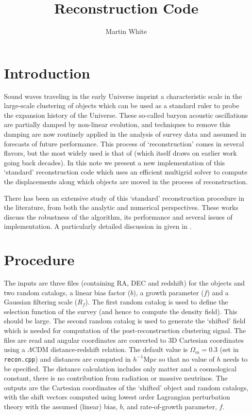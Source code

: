 \documentclass[a4paper,11pt]{article}
\author[a,b]{Martin White}
\affiliation[a]{Department of Physics, University of California,
Berkeley, CA}
\affiliation[b]{Lawrence Berkeley Laboratory, 1 Cyclotron Road,
Berkeley, CA}
\title{Reconstruction Code}
\begin{document}
\maketitle
\flushbottom

\section{Introduction}
\label{sec:intro}

Sound waves traveling in the early Universe imprint a characteristic
scale in the large-scale clustering of objects which can be used as a
standard ruler to probe the expansion history of the Universe.  These
so-called baryon acoustic oscillations are partially damped by
non-linear evolution, and techniques to remove this damping are now
routinely applied in the analysis of survey data and assumed in
forecasts of future performance.  This process of `reconstruction'
comes in several flavors, but the most widely used is that of
\cite{Eis07} (which itself draws on earlier work going back decades).
In this note we present a new implementation of this `standard'
reconstruction code which uses an efficient multigrid solver to
compute the displacements along which objects are moved in the process
of reconstruction.

There has been an extensive study of this `standard' reconstruction procedure
in the literature, from both the analytic \cite{PWC09,NWP09,TasZal12,ZelRecon}
and numerical \cite{Seo10,Pad12,Xu13,Bur14,Toj14,Var14,Bur15} perspectives.
These works discuss the robustness of the algorithm, its performance and
several issues of implementation.
A particularly detailed discussion in given in \cite{Pad12,Bur14,Bur15}.

\section{Procedure}

The inputs are three files (containing RA, DEC and redshift) for the objects
and two random catalogs, a linear bias factor ($b$), a growth parameter ($f$)
and a Gaussian filtering scale ($R_f$).
The first random catalog is used to define the selection function of the
survey (and hence to compute the density field).  This should be large.  The
second random catalog is used to generate the `shifted' field which is needed
for computation of the post-reconstruction clustering signal.
The files are read and angular coordinates are converted to 3D Cartesian
coordinates using a $\Lambda$CDM distance-redshift relation.  The default
value is $\Omega_m=0.3$ (set in {\tt recon.cpp}) and distances are computed
in $h^{-1}$Mpc so that no value of $h$ needs to be specified.  The distance
calculation includes only matter and a cosmological constant, there is no
contribution from radiation or massive neutrinos.
The outputs are the Cartesian coordinates of the `shifted' object and
random catalogs, with the shift vectors computed using lowest order
Lagrangian perturbation theory with the assumed (linear) bias, $b$, and
rate-of-growth parameter, $f$.
\end{document}
